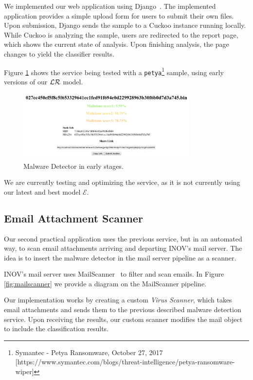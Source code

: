 We implemented our web application using Django~\cite{tool:django}.
The implemented application provides a simple upload form for users to submit their own files.
Upon submission, Django sends the sample to a Cuckoo instance running locally.
While Cuckoo is analyzing the sample, users are redirected to the report page, which shows the current state of analysis.
Upon finishing analysis, the page changes to yield the classifier results.

Figure \ref{fig:malware_detetor} shows the service being tested with a \texttt{petya}\footnote{Symantec - Petya Ransomware, October 27, 2017 [https://www.symantec.com/blogs/threat-intelligence/petya-ransomware-wiper]} sample, using early versions of our $\mathcal{LR}$ model.

\begin{figure}[!h]
	\centering
	\includegraphics[width=0.8\textwidth]{Figures/malware_detector.png}
	\caption{Malware Detector in early stages.}
	\label{fig:malware_detetor}
\end{figure}

We are currently testing and optimizing the service, as it is not currently using our latest and best model $\mathcal{E}$.

\subsection{Email Attachment Scanner}
\label{section:email_scanner}

Our second practical application uses the previous service, but in an automated way, to scan email attachments arriving and departing INOV's mail server.
The idea is to insert the malware detector in the mail server pipeline as a scanner.

INOV's mail server uses MailScanner~\cite{tool:mailscanner} to filter and scan emails.
In Figure \ref{fig:mailscanner} we provide a diagram on the MailScanner pipeline.

Our implementation works by creating a custom \textit{Virus Scanner}, which takes email attachments and sends them to the previous described malware detection service.
Upon receiving the results, our custom scanner modifies the mail object to include the classification results.

